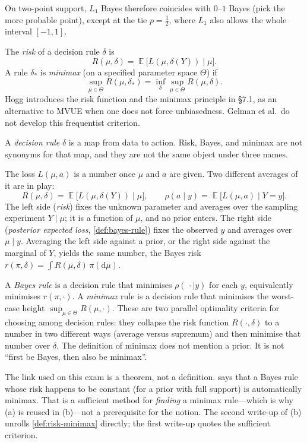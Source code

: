 \documentclass[11pt,a4paper]{article}
\DeclareMathOperator{\E}{\mathbb{E}}
\begin{document}
On two-point support, \(L_1\) Bayes therefore coincides with \(0\)--\(1\) Bayes (pick the more probable point), except at the tie \(p=\tfrac12\), where \(L_1\) also allows the whole interval \([-1,1]\).

\begin{definition}
\label{def:risk-minimax}
The \emph{risk} of a decision rule \(\delta\) is
\[
R(\mu,\delta)
=
\E\bigl[L(\mu,\delta(Y))\mid\mu\bigr].
\]
A rule \(\delta_*\) is \emph{minimax} (on a specified parameter space \(\Theta\)) if
\[
\sup_{\mu\in\Theta} R(\mu,\delta_*)
=
\inf_{\delta}\sup_{\mu\in\Theta} R(\mu,\delta).
\]
Hogg introduces the risk function and the minimax principle in \S7.1, as an alternative to MVUE when one does not force unbiasedness. Gelman et al.\ do not develop this frequentist criterion.
\end{definition}

\begin{remark}
\label{rem:risk-vs-bayes}
A \emph{decision rule} \(\delta\) is a map from data to action. Risk, Bayes, and minimax are not synonyms for that map, and they are not the same object under three names.

The loss \(L(\mu,a)\) is a number once \(\mu\) and \(a\) are given. Two different averages of it are in play:
\[
R(\mu,\delta)
=
\E\bigl[L(\mu,\delta(Y))\mid\mu\bigr],
\qquad
\rho(a\mid y)
=
\E\bigl[L(\mu,a)\mid Y=y\bigr].
\]
The left side (\emph{risk}) fixes the unknown parameter and averages over the sampling experiment \(Y\mid\mu\); it is a function of \(\mu\), and no prior enters. The right side (\emph{posterior expected loss}, \cref{def:bayes-rule}) fixes the observed \(y\) and averages over \(\mu\mid y\). Averaging the left side against a prior, or the right side against the marginal of \(Y\), yields the same number, the Bayes risk \(r(\pi,\delta)=\int R(\mu,\delta)\,\pi(\mathrm{d}\mu)\).

A \emph{Bayes rule} is a decision rule that minimises \(\rho(\,\cdot\mid y)\) for each \(y\), equivalently minimises \(r(\pi,\cdot)\). A \emph{minimax} rule is a decision rule that minimises the worst-case height \(\sup_{\mu\in\Theta}R(\mu,\cdot)\). These are two parallel optimality criteria for choosing among decision rules: they collapse the risk function \(R(\cdot,\delta)\) to a number in two different ways (average versus supremum) and then minimise that number over \(\delta\). The definition of minimax does not mention a prior. It is not ``first be Bayes, then also be minimax''.

The link used on this exam is a theorem, not a definition.  says that a Bayes rule whose risk happens to be constant (for a prior with full support) is automatically minimax. That is a sufficient method for \emph{finding} a minimax rule---which is why (a) is reused in (b)---not a prerequisite for the notion. The second write-up of (b) unrolls \cref{def:risk-minimax} directly; the first write-up quotes the sufficient criterion.
\end{remark}
\end{document}
